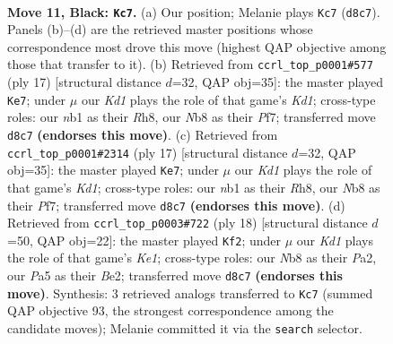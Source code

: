 \documentclass[11pt]{article}
\begin{document}
\clearpage

\begin{figure}[p]\centering
\begin{subfigure}{0.46\textwidth}\centering
\resizebox{\linewidth}{!}{%
\newchessgame
\chessboard[
  setfen={rnbkr3/1p3ppp/4pn2/p1b5/P6P/1B2PN2/1P3PP1/RNB2RK1 b - - 0 11},
  showmover=false,
  pgfstyle=straightmove, color=movearrow, markmove={d8-c7}
]}
\caption{}
\end{subfigure}\hfill
\begin{subfigure}{0.46\textwidth}\centering
\resizebox{\linewidth}{!}{%
\newchessgame
\chessboard[
  setfen={rnbk3r/1p3ppp/p3pn2/2b5/8/4PN2/PP2BPPP/RNB2RK1 b - - 1 9},
  showmover=false,
  pgfstyle=straightmove, color=movearrow, markmove={d8-e7}
]}
\caption{}
\end{subfigure}
\\[4pt]
\begin{subfigure}{0.46\textwidth}\centering
\resizebox{\linewidth}{!}{%
\newchessgame
\chessboard[
  setfen={rnbk3r/1p3ppp/p3pn2/2b5/8/4PN2/PP2BPPP/RNB2RK1 b - - 1 9},
  showmover=false,
  pgfstyle=straightmove, color=movearrow, markmove={d8-e7}
]}
\caption{}
\end{subfigure}\hfill
\begin{subfigure}{0.46\textwidth}\centering
\resizebox{\linewidth}{!}{%
\newchessgame
\chessboard[
  setfen={rnb1kb1r/pp3pp1/2pp1n2/7p/3P1N2/5P2/PPP1B1PP/RNB1K2R w KQkq - 0 10},
  showmover=false,
  pgfstyle=straightmove, color=movearrow, markmove={e1-f2}
]}
\caption{}
\end{subfigure}
\caption{\textbf{Move 11, Black: \texttt{Kc7}.} (a) Our position; Melanie plays \texttt{Kc7} (\texttt{d8c7}). Panels (b)--(d) are the retrieved master positions whose correspondence most drove this move (highest QAP objective among those that transfer to it). (b) Retrieved from \texttt{ccrl\_top\_p0001\#577} (ply 17) [structural distance $d$=32, QAP obj=35]: the master played \texttt{Ke7}; under $\mu$ our \emph{Kd1} plays the role of that game's \emph{Kd1}; cross-type roles: our \emph{n}b1 as their \emph{R}h8, our \emph{N}b8 as their \emph{P}f7; transferred move \texttt{d8c7} \textbf{(endorses this move)}. (c) Retrieved from \texttt{ccrl\_top\_p0001\#2314} (ply 17) [structural distance $d$=32, QAP obj=35]: the master played \texttt{Ke7}; under $\mu$ our \emph{Kd1} plays the role of that game's \emph{Kd1}; cross-type roles: our \emph{n}b1 as their \emph{R}h8, our \emph{N}b8 as their \emph{P}f7; transferred move \texttt{d8c7} \textbf{(endorses this move)}. (d) Retrieved from \texttt{ccrl\_top\_p0003\#722} (ply 18) [structural distance $d$=50, QAP obj=22]: the master played \texttt{Kf2}; under $\mu$ our \emph{Kd1} plays the role of that game's \emph{Ke1}; cross-type roles: our \emph{N}b8 as their \emph{P}a2, our \emph{P}a5 as their \emph{B}e2; transferred move \texttt{d8c7} \textbf{(endorses this move)}. Synthesis: 3 retrieved analogs transferred to \texttt{Kc7} (summed QAP objective 93, the strongest correspondence among the candidate moves); Melanie committed it via the \texttt{search} selector.}
\label{fig:thought-m21}
\end{figure}
\end{document}
